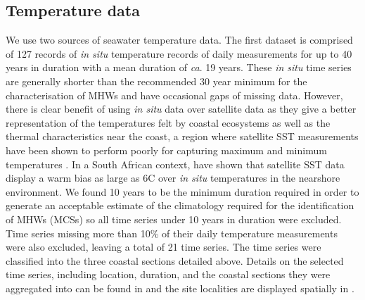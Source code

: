 \documentclass[a4paper,10pt,review]{elsarticle}
\begin{document}
\subsection{Temperature data}
We use two sources of seawater temperature data. The first dataset is comprised of 127 records of \emph{in situ} temperature records of daily measurements for up to 40 years in duration with a mean duration of \emph{ca}. 19 years. These \emph{in situ} time series are generally shorter than the recommended 30 year minimum for the characterisation of MHWs \citep{Hobday2016} and have occasional gaps of missing data. However, there is clear benefit of using \emph{in situ} data over satellite data as they give a better representation of the temperatures felt by coastal ecosystems as well as the thermal characteristics near the coast, a region where satellite SST measurements have been shown to perform poorly for capturing maximum and minimum temperatures \citep[e.g.][]{Smale2009, Castillo2010}. In a South African context, \citet{Smit2013} have shown that satellite SST data display a warm bias as large as 6\degree C over \emph{in situ} temperatures in the nearshore environment. We found 10 years to be the minimum duration required in order to generate an acceptable estimate of the climatology required for the identification of MHWs (MCSs) so all time series under 10 years in duration were excluded. Time series missing more than 10\% of their daily temperature measurements were also excluded, leaving a total of 21 time series. The time series were classified into the three coastal sections detailed above. Details on the selected time series, including location, duration, and the coastal sections they were aggregated into can be found in  and the site localities are displayed spatially in .
\end{document}
